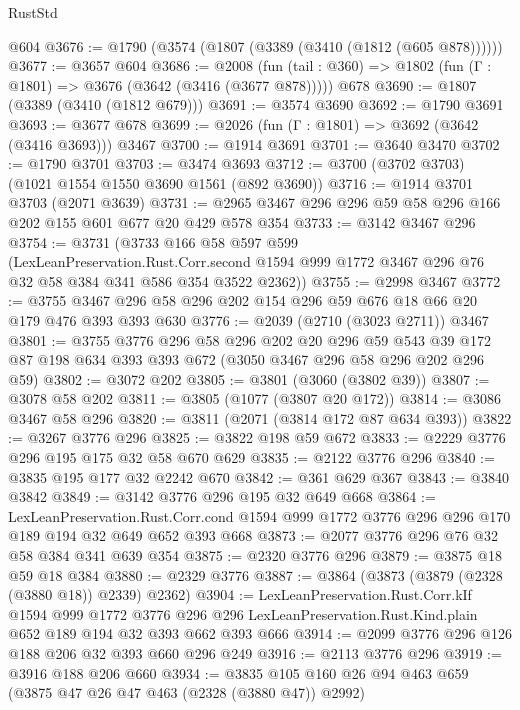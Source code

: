 \begin{lexlean}{RustStd}
\begin{coremodule}
    @604
@3676 := @1790 (@3574 (@1807 (@3389 (@3410 (@1812 (@605 @878))))))
@3677 := @3657 @604
@3686 := @2008
    (fun (tail : @360) => @1802 (fun (Γ : @1801) => @3676 (@3642 (@3416 (@3677 @878)))))
    @678
@3690 := @1807 (@3389 (@3410 (@1812 @679)))
@3691 := @3574 @3690
@3692 := @1790 @3691
@3693 := @3677 @678
@3699 := @2026 (fun (Γ : @1801) => @3692 (@3642 (@3416 @3693))) @3467
@3700 := @1914 @3691
@3701 := @3640 @3470
@3702 := @1790 @3701
@3703 := @3474 @3693
@3712 := @3700 (@3702 @3703) (@1021 @1554 @1550 @3690 @1561 (@892 @3690))
@3716 := @1914 @3701 @3703 (@2071 @3639)
@3731 := @2965 @3467 @296 @296 @59 @58 @296 @166 @202 @155 @601 @677 @20 @429 @578 @354
@3733 := @3142 @3467 @296
@3754 := @3731
    (@3733
      @166
      @58
      @597
      @599
      (LexLeanPreservation.Rust.Corr.second
        @1594
        @999
        @1772
        @3467
        @296
        @76
        @32
        @58
        @384
        @341
        @586
        @354
        @3522
        @2362))
@3755 := @2998 @3467
@3772 := @3755 @3467 @296 @58 @296 @202 @154 @296 @59 @676 @18 @66 @20 @179 @476 @393 @393 @630
@3776 := @2039 (@2710 (@3023 @2711)) @3467
@3801 := @3755
    @3776
    @296
    @58
    @296
    @202
    @20
    @296
    @59
    @543
    @39
    @172
    @87
    @198
    @634
    @393
    @393
    @672
    (@3050 @3467 @296 @58 @296 @202 @296 @59)
@3802 := @3072 @202
@3805 := @3801 (@3060 (@3802 @39))
@3807 := @3078 @58 @202
@3811 := @3805 (@1077 (@3807 @20 @172))
@3814 := @3086 @3467 @58 @296
@3820 := @3811 (@2071 (@3814 @172 @87 @634 @393))
@3822 := @3267 @3776 @296
@3825 := @3822 @198 @59 @672
@3833 := @2229 @3776 @296 @195 @175 @32 @58 @670 @629
@3835 := @2122 @3776 @296
@3840 := @3835 @195 @177 @32 @2242 @670
@3842 := @361 @629 @367
@3843 := @3840 @3842
@3849 := @3142 @3776 @296 @195 @32 @649 @668
@3864 := LexLeanPreservation.Rust.Corr.cond
    @1594
    @999
    @1772
    @3776
    @296
    @296
    @170
    @189
    @194
    @32
    @649
    @652
    @393
    @668
@3873 := @2077 @3776 @296 @76 @32 @58 @384 @341 @639 @354
@3875 := @2320 @3776 @296
@3879 := @3875 @18 @59 @18 @384
@3880 := @2329 @3776
@3887 := @3864 (@3873 (@3879 (@2328 (@3880 @18)) @2339) @2362)
@3904 := LexLeanPreservation.Rust.Corr.kIf
    @1594
    @999
    @1772
    @3776
    @296
    @296
    LexLeanPreservation.Rust.Kind.plain
    @652
    @189
    @194
    @32
    @393
    @662
    @393
    @666
@3914 := @2099 @3776 @296 @126 @188 @206 @32 @393 @660 @296 @249
@3916 := @2113 @3776 @296
@3919 := @3916 @188 @206 @660
@3934 := @3835 @105 @160 @26 @94 @463 @659 (@3875 @47 @26 @47 @463 (@2328 (@3880 @47)) @2992)

\end{coremodule}
\end{lexlean}
